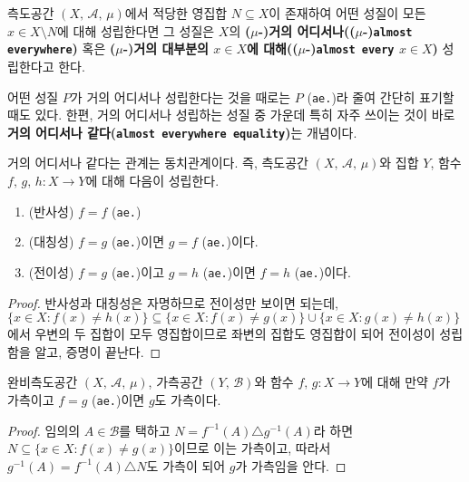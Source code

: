 \begin{definition}
    측도공간 $(X,\,\mathcal{A},\,\mu)$에서 적당한 영집합 $N\subseteq X$이 존재하여 어떤 성질이 모든 $x\in X\setminus N$에 대해 성립한다면 그 성질은 $X$의 \textbf{($\mu$-)거의 어디서나(($\mu$-)\texttt{almost everywhere})} 혹은 \textbf{($\mu$-)거의 대부분의 $x\in X$에 대해(($\mu$-)\texttt{almost every} $x\in X$)} 성립한다고 한다.
\end{definition}

어떤 성질 $P$가 거의 어디서나 성립한다는 것을 때로는 $P$ (\texttt{ae.})라 줄여 간단히 표기할 때도 있다. 한편, 거의 어디서나 성립하는 성질 중 가운데 특히 자주 쓰이는 것이 바로 \textbf{거의 어디서나 같다(\texttt{almost everywhere equality})}는 개념이다.

\begin{proposition}
    거의 어디서나 같다는 관계는 동치관계이다. 즉, 측도공간 $(X,\,\mathcal{A},\,\mu)$와 집합 $Y$,  함수 $f,\,g,\,h:X\to Y$에 대해 다음이 성립한다.
    \begin{enumerate}
        \item (반사성) $f=f$ (\texttt{ae.})
        \item (대칭성) $f=g$ (\texttt{ae.})이면 $g=f$ (\texttt{ae.})이다.
        \item (전이성) $f=g$ (\texttt{ae.})이고 $g=h$ (\texttt{ae.})이면 $f=h$ (\texttt{ae.})이다.
    \end{enumerate}
\end{proposition}

\begin{proof}
    반사성과 대칭성은 자명하므로 전이성만 보이면 되는데, $\{x\in X:f(x)\ne h(x)\}\subseteq\{x\in X:f(x)\ne g(x)\}\cup\{x\in X:g(x)\ne h(x)\}$에서 우변의 두 집합이 모두 영집합이므로 좌변의 집합도 영집합이 되어 전이성이 성립함을 알고, 증명이 끝난다.
\end{proof}

\begin{theorem}\label{thm:equalityAeMeasurable}
    완비측도공간 $(X,\,\mathcal{A},\,\mu)$, 가측공간 $(Y,\,\mathcal{B})$와 함수 $f,\,g:X\to Y$에 대해 만약 $f$가 가측이고 $f=g$ (\texttt{ae.})이면 $g$도 가측이다.
\end{theorem}

\begin{proof}
    임의의 $A\in\mathcal{B}$를 택하고 $N=f^{-1}(A)\triangle g^{-1}(A)$라 하면 $N\subseteq\{x\in X:f(x)\ne g(x)\}$이므로 이는 가측이고, 따라서 $g^{-1}(A)=f^{-1}(A)\triangle N$도 가측이 되어 $g$가 가측임을 안다.
\end{proof}

